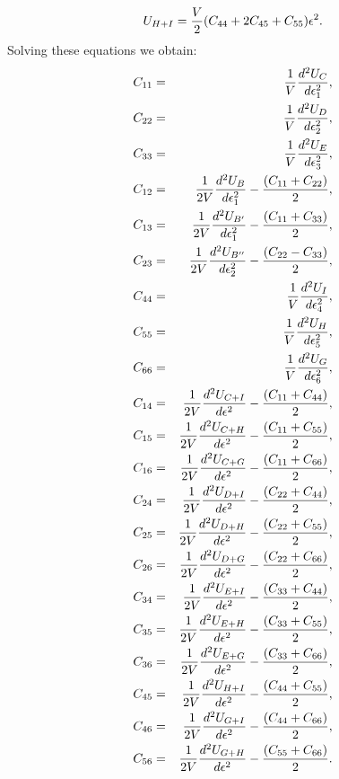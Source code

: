 \documentclass[12pt,a4paper]{article}
\begin{document}
\begin{equation}
U_{H+I}= {V \over 2} (C_{44}+2 C_{45} + C_{55}) \epsilon^2.
\end{equation}
Solving these equations we obtain:
\begin{eqnarray}
C_{11}&=&{1 \over V} {d^2 U_C \over d \epsilon_1^2}, \\ 
C_{22}&=&{1 \over V} {d^2 U_D \over d \epsilon_2^2}, \\ 
C_{33}&=&{1 \over V} {d^2 U_E \over d \epsilon_3^2}, \\ 
C_{12}&=&{1 \over 2 V} {d^2 U_B \over d \epsilon_1^2} - 
                             {(C_{11}+ C_{22})\over 2}, \\
C_{13}&=&{1 \over 2 V} {d^2 U_{B'} \over d \epsilon_1^2} - 
                             {(C_{11} + C_{33})\over 2}, \\
C_{23}&=&{1 \over 2 V} {d^2 U_{B''} \over d \epsilon_2^2} - 
                             {(C_{22} - C_{33})\over 2}, \\
C_{44}&=&{1 \over V} {d^2 U_I \over d \epsilon_4^2}, \\
C_{55}&=&{1 \over V} {d^2 U_H \over d \epsilon_5^2}, \\
C_{66}&=&{1 \over V} {d^2 U_G \over d \epsilon_6^2}, \\
C_{14}&=&{1 \over 2 V} {d^2 U_{C+I} \over d \epsilon^2} - {(C_{11} + C_{44})\over 2}, \\
C_{15}&=&{1 \over 2 V} {d^2 U_{C+H} \over d \epsilon^2} - {(C_{11} + C_{55})\over 2}, \\
C_{16}&=&{1 \over 2 V} {d^2 U_{C+G} \over d \epsilon^2} - {(C_{11} + C_{66})\over 2}, \\
C_{24}&=&{1 \over 2 V} {d^2 U_{D+I} \over d \epsilon^2} - {(C_{22} + C_{44})\over 2}, \\
C_{25}&=&{1 \over 2 V} {d^2 U_{D+H} \over d \epsilon^2} - {(C_{22} + C_{55})\over 2}, \\
C_{26}&=&{1 \over 2 V} {d^2 U_{D+G} \over d \epsilon^2} - {(C_{22} + C_{66})\over 2}, \\
C_{34}&=&{1 \over 2 V} {d^2 U_{E+I} \over d \epsilon^2} - {(C_{33} + C_{44})\over 2}, \\
C_{35}&=&{1 \over 2 V} {d^2 U_{E+H} \over d \epsilon^2} - {(C_{33} + C_{55})\over 2}, \\
C_{36}&=&{1 \over 2 V} {d^2 U_{E+G} \over d \epsilon^2} - {(C_{33} + C_{66})\over 2}, \\
C_{45}&=&{1 \over 2 V} {d^2 U_{H+I} \over d \epsilon^2} - {(C_{44} + C_{55})\over 2}, \\
C_{46}&=&{1 \over 2 V} {d^2 U_{G+I} \over d \epsilon^2} - {(C_{44} + C_{66})\over 2}, \\
C_{56}&=&{1 \over 2 V} {d^2 U_{G+H} \over d \epsilon^2} - {(C_{55} + C_{66})\over 2}.
\end{eqnarray}
\end{document}
